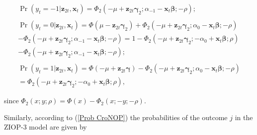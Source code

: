\documentclass[letterpaper,fleqn,12pt]{article}
\begin{document}
\begin{flushleft}
\begin{equation}
\begin{array}{l}
\Pr (y_{t}=-1|\mathbf{z}_{2t},\mathbf{x}_{t})=\Phi _{2}(-\mu +\mathbf{z}_{2t}%
\mathbf{\gamma }_{2};\alpha _{-1}-\mathbf{x}_{t}\mathbf{\beta };\mathbf{-}%
\rho ); \\ 
\\ 
\Pr (y_{t}=0|\mathbf{z}_{2t},\mathbf{x}_{t})=\Phi (\mu -\mathbf{z}_{2t}%
\mathbf{\gamma }_{2})+\Phi _{2}(-\mu +\mathbf{z}_{2t}\mathbf{\gamma }%
_{2};\alpha _{0}-\mathbf{x}_{t}\mathbf{\beta };\mathbf{-}\rho ) \\ 
-\Phi _{2}(-\mu +\mathbf{z}_{2t}\mathbf{\gamma }_{2};\alpha _{-1}-\mathbf{x}%
_{t}\mathbf{\beta };\mathbf{-}\rho )=1-\Phi _{2}(-\mu +\mathbf{z}_{2t}%
\mathbf{\gamma }_{2};-\alpha _{0}+\mathbf{x}_{t}\mathbf{\beta };\rho ) \\ 
-\Phi _{2}(-\mu +\mathbf{z}_{2t}\mathbf{\gamma }_{2};\alpha _{-1}-\mathbf{x}%
_{t}\mathbf{\beta };\mathbf{-}\rho ); \\ 
\\ 
\Pr (y_{t}=1|\mathbf{z}_{2t},\mathbf{x}_{t})=\Phi (-\mu +\mathbf{z}_{2t}%
\mathbf{\gamma })-\Phi _{2}(-\mu +\mathbf{z}_{2t}\mathbf{\gamma }_{2};\alpha
_{0}-\mathbf{x}_{t}\mathbf{\beta };\mathbf{-}\rho ) \\ 
=\Phi _{2}(-\mu +\mathbf{z}_{2t}\mathbf{\gamma }_{2};-\alpha _{0}+\mathbf{x}%
_{t}\mathbf{\beta };\rho ),%
\end{array}
\label{Prob spec ZIOP-2}
\end{equation}
\end{flushleft}

\noindent since $\Phi _{2}(x;y;\rho )=\Phi (x)-\Phi _{2}(x;-y;-\rho )$.

Similarly, according to (\ref{Prob CroNOP}) the probabilities of the outcome 
$j$ in the ZIOP-3 model are given by

\bigskip
\end{document}
